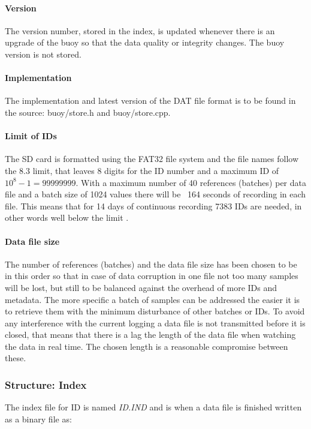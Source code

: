 \documentclass[a4paper]{article}
\begin{document}
\begin{multicols}{2}
  \paragraph{Version} The version number, stored in the index,
  is updated whenever there is an upgrade of the buoy so that the
  data quality or integrity changes. The buoy version is not stored.

  \paragraph{Implementation}
  The implementation and latest version of the DAT file format is to be
  found in the source: buoy/store.h and buoy/store.cpp.

  \paragraph{Limit of IDs}
  The SD card is formatted using the FAT32 file system and the file
  names follow the 8.3 limit, that leaves 8 digits for the ID number and
  a maximum ID of $10^8 - 1 = 99999999$. With a maximum number of 40 references
  (batches) per data file and a batch size of 1024 values there will be
  ~164 seconds of recording in each file. This means that for 14 days of
  continuous recording 7383 IDs are needed, in other words well below
  the limit \cite{local_data_capacity_budget}.

  \paragraph{Data file size}
  The number of references (batches) and the data file size has been
  chosen to be in this order so that in case of data corruption in one
  file not too many samples will be lost, but still to be balanced
  against the overhead of more IDs and metadata. The more specific a
  batch of samples can be addressed the easier it is to retrieve them
  with the minimum disturbance of other batches or IDs. To avoid any
  interference with the current logging a data file is not transmitted
  before it is closed, that means that there is a lag the length of the
  data file when watching the data in real time. The chosen length is a
  reasonable compromise between these.


  \subsubsection{Structure: Index}
  The index file for ID is named \textit{ID.IND} and is when a data file
  is finished written as a binary file as:
  \vspace{1em}


\end{multicols}
\end{document}
